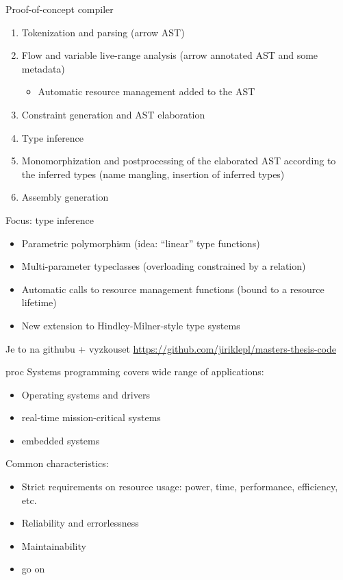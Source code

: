 \documentclass[aspectratio=169]{beamer}
\newcommand{\xxx}[1]{\textcolor{red!}{#1}}
\begin{document}
\begin{frame}{Proof-of-concept compiler}
  \begin{enumerate}
    \item Tokenization and parsing (\xxx{arrow} AST)
    \item Flow and variable live-range analysis (\xxx{arrow} annotated AST and \xxx{some metadata})
    \begin{itemize}
      \color{olive}
      \item Automatic resource management added to the AST
    \end{itemize}
    \item Constraint generation and AST elaboration
    \item Type inference
    \item Monomorphization and postprocessing of the elaborated AST according to the inferred types (name mangling, insertion of inferred types)
    \item Assembly generation
  \end{enumerate}
\end{frame}

\begin{frame}{\xxx{Focus: type inference}}
  \begin{itemize}
    \item Parametric polymorphism (idea: ``linear'' type functions)
    \item Multi-parameter typeclasses (overloading constrained by a relation)
    \item Automatic calls to resource management functions (bound to a resource lifetime)
    \item New extension to Hindley-Milner-style type systems
  \end{itemize}
\end{frame}

\begin{frame}[standout]{Je to na githubu + vyzkouset}
  \url{https://github.com/jiriklepl/masters-thesis-code}
\end{frame}

\begin{frame}{proc}
  Systems programming covers wide range of applications:

  \begin{itemize}
    \item Operating systems and drivers
    \item real-time mission-critical systems
    \item embedded systems
  \end{itemize}

  Common characteristics:

  \begin{itemize}
    \item Strict requirements on resource usage: power, time, performance, efficiency, etc.
    \item Reliability and errorlessness
    \item Maintainability
    \item \xxx{go on}
  \end{itemize}
\end{frame}
\end{document}
